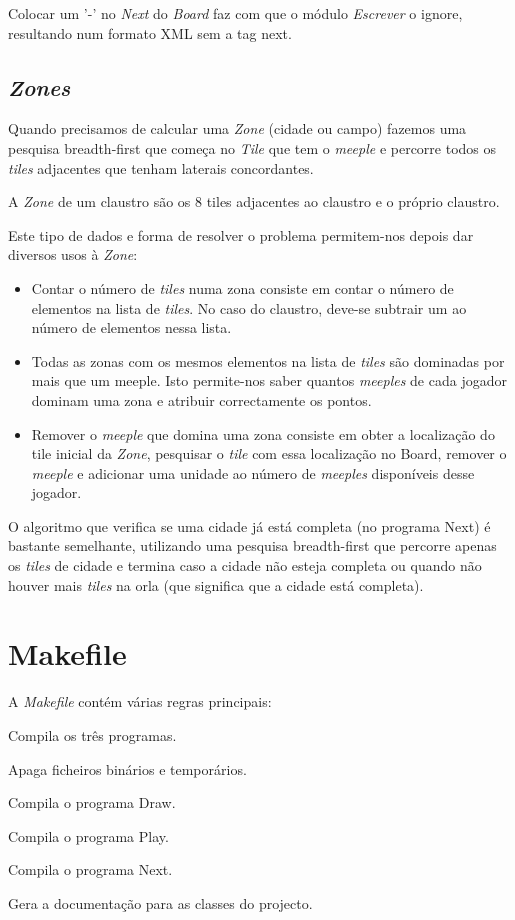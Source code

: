 \documentclass[11pt, a4paper, twoside]{article}
\begin{document}
Colocar um '-' no \emph{Next} do \emph{Board} faz com que o módulo \emph{Escrever} o ignore, resultando num formato XML sem a tag next.

\newpage
\subsection[Zones]{\emph{Zones}}
Quando precisamos de calcular uma \emph{Zone} (cidade ou campo) fazemos uma pesquisa breadth-first que começa no \emph{Tile} que tem o \emph{meeple} e percorre todos os \emph{tiles} adjacentes que tenham laterais concordantes.

A \emph{Zone} de um claustro são os 8 tiles adjacentes ao claustro e o próprio claustro.

Este tipo de dados e forma de resolver o problema permitem-nos depois dar diversos usos à \emph{Zone}:

\begin{itemize}
  \item Contar o número de \emph{tiles} numa zona consiste em contar o número de elementos na lista de \emph{tiles}. No caso do claustro, deve-se subtrair um ao número de elementos nessa lista.
  \item Todas as zonas com os mesmos elementos na lista de \emph{tiles} são dominadas por mais que um meeple. Isto permite-nos saber quantos \emph{meeples} de cada jogador dominam uma zona e atribuir correctamente os pontos.
  \item Remover o \emph{meeple} que domina uma zona consiste em obter a localização do tile inicial da \emph{Zone}, pesquisar o \emph{tile} com essa localização no Board, remover o \emph{meeple} e adicionar uma unidade ao número de \emph{meeples} disponíveis desse jogador.
\end{itemize}

O algoritmo que verifica se uma cidade já está completa (no programa Next) é bastante semelhante, utilizando uma pesquisa breadth-first que percorre apenas os \emph{tiles} de cidade e termina caso a cidade não esteja completa ou quando não houver mais \emph{tiles} na orla (que significa que a cidade está completa).

\newpage
\section{Makefile}
A \emph{Makefile} contém várias regras principais:

\begin{description}[style=multiline,leftmargin=2cm,font=\bfseries]
    \item[all] Compila os três programas.
    \item[clean] Apaga ficheiros binários e temporários.
    \item[draw] Compila o programa Draw.
    \item[play] Compila o programa Play.
    \item[next] Compila o programa Next.
    \item[doc] Gera a documentação para as classes do projecto.
\end{description}
\end{document}
